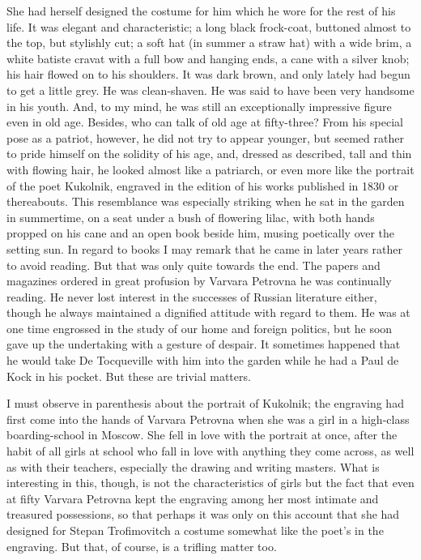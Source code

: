 \documentclass[12pt]{article}
\begin{document}
\vspace{12pt}
She had herself designed the costume for him which he wore for the rest
of his life. It was elegant and characteristic; a long black frock-coat,
buttoned almost to the top, but stylishly cut; a soft hat (in summer a
straw hat) with a wide brim, a white batiste cravat with a full bow
and hanging ends, a cane with a silver knob; his hair flowed on to his
shoulders. It was dark brown, and only lately had begun to get a little
grey. He was clean-shaven. He was said to have been very handsome in his
youth. And, to my mind, he was still an exceptionally impressive figure
even in old age. Besides, who can talk of old age at fifty-three?
From his special pose as a patriot, however, he did not try to appear
younger, but seemed rather to pride himself on the solidity of his
age, and, dressed as described, tall and thin with flowing hair, he
looked almost like a patriarch, or even more like the portrait of the
poet Kukolnik, engraved in the edition of his works published in 1830 or
thereabouts. This resemblance was especially striking when he sat in the
garden in summertime, on a seat under a bush of flowering lilac, with
both hands propped on his cane and an open book beside him, musing
poetically over the setting sun. In regard to books I may remark that
he came in later years rather to avoid reading. But that was only quite
towards the end. The papers and magazines ordered in great profusion by
Varvara Petrovna he was continually reading. He never lost interest in
the successes of Russian literature either, though he always maintained
a dignified attitude with regard to them. He was at one time engrossed
in the study of our home and foreign politics, but he soon gave up the
undertaking with a gesture of despair. It sometimes happened that he
would take De Tocqueville with him into the garden while he had a Paul
de Kock in his pocket. But these are trivial matters.


\vspace{12pt}
I must observe in parenthesis about the portrait of Kukolnik; the
engraving had first come into the hands of Varvara Petrovna when she was
a girl in a high-class boarding-school in Moscow. She fell in love with
the portrait at once, after the habit of all girls at school who fall
in love with anything they come across, as well as with their teachers,
especially the drawing and writing masters. What is interesting in this,
though, is not the characteristics of girls but the fact that even at
fifty Varvara Petrovna kept the engraving among her most intimate and
treasured possessions, so that perhaps it was only on this account that
she had designed for Stepan Trofimovitch a costume somewhat like the
poet's in the engraving. But that, of course, is a trifling matter too.
\end{document}
